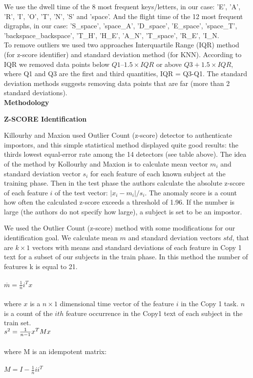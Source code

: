 \documentclass[12pt,a4]{article}
\begin{document}
We use the dwell time of the 8 most frequent keys/letters, in our case: 
'E', 'A', 'R', 'I', 'O', 'T', 'N', 'S' and 'space'. And the flight time of the 12 most frequent digraphs, in our case: 'S\_space', 'space\_A', 'D\_space', 'E\_space', 'space\_T', 'backspace\_backspace', 'T\_H', 'H\_E', 'A\_N', 'T\_space', 'R\_E', 'I\_N. \\

To remove outliers we used two approaches Interquartile Range (IQR) method (for z-score identifier) and standard deviation method (for KNN). According to IQR we removed data points below $Q1 – 1.5×IQR$ or above $Q3 + 1.5×IQR$, where Q1 and Q3 are the first and third quantities, IQR = Q3-Q1. The standard deviation methods suggests removing data points that are far (more than 2 standard deviations).\\

\bigskip
\large\textbf{Methodology }
\bigskip

\medskip
\small\textbf{Z-SCORE Identification}
\medskip

\normalsize

Killourhy and Maxion \cite{killourhy2009comparing} used Outlier Count (z-score) detector to authenticate impostors, and this simple statistical method displayed quite good results: the thirds lowest equal-error rate among the 14 detectors (see table above).  The idea of the method by Kollourhy and Maxion is to calculate mean vector $m_i$ and standard deviation vector $s_i$ for each feature of each known subject at the training phase. Then in the test phase the authors calculate the absolute z-score of each feature $i$ of the test vector: $|x_i-m_i|/s_i$. The anomaly score is a count how often the calculated z-score exceeds a threshold of 1.96. If the number is large (the authors do not specify how large), a subject is set to be an impostor. 

We used the Outlier Count (z-score) method with some modifications for our identification goal. We calculate mean $m$ and standard deviation vectors $std$, that are $k \times 1$ vectors with means and standard deviations of each feature in Copy 1 text for a subset of our subjects in the train phase. In this method the number of features k is equal to 21.\\
\\
$
\overline{m} = \frac{1}{n}i^T x
$\\
\\
 where $x$ is a $n\times 1$ dimensional time vector of the feature $i$ in the Copy 1 task. $n$ is a count of the $ith$ feature occurrence in the Copy1 text of each subject in the train set. \\
$
\\
s^2 = \frac{1}{n-1} x^T M x
$\\
\\
where M  is an idempotent matrix: \\
\\
$
M = I - \frac{1}{n}ii^T
$\\
\end{document}
